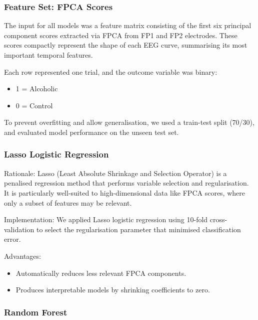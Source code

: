 \documentclass{article}
\begin{document}
\subsubsection{Feature Set: FPCA Scores}\label{feature-set-fpca-scores}

The input for all models was a feature matrix consisting of the first
six principal component scores extracted via FPCA from FP1 and FP2
electrodes. These scores compactly represent the shape of each EEG
curve, summarising its most important temporal features.

Each row represented one trial, and the outcome variable was binary:

\begin{itemize}
\item
  1 = Alcoholic
\item
  0 = Control
\end{itemize}

To prevent overfitting and allow generalisation, we used a train-test
split (70/30), and evaluated model performance on the unseen test set.

\subsubsection{Lasso Logistic
Regression}\label{lasso-logistic-regression}

Rationale: Lasso (Least Absolute Shrinkage and Selection Operator) is a
penalised regression method that performs variable selection and
regularisation. It is particularly well-suited to high-dimensional data
like FPCA scores, where only a subset of features may be relevant.

Implementation: We applied Lasso logistic regression using 10-fold
cross-validation to select the regularisation parameter that minimised
classification error.

Advantages:

\begin{itemize}
\item
  Automatically reduces less relevant FPCA components.
\item
  Produces interpretable models by shrinking coefficients to zero.
\end{itemize}

\subsubsection{Random Forest}\label{random-forest}
\end{document}
